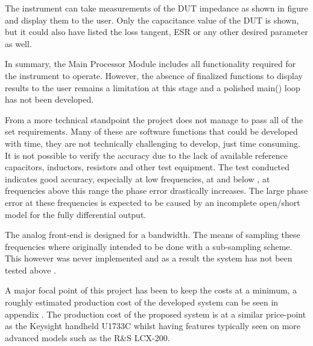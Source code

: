 The instrument can take measurements of the DUT impedance as shown in figure  and display them to the user. Only the capacitance value of the DUT is shown, but it could also have listed the loss tangent, ESR or any other desired parameter as well.

In summary, the Main Processor Module includes all functionality required for the instrument to operate. However, the absence of finalized functions to display results to the user remains a limitation at this stage and a polished main() loop has not been developed.

From a more technical standpoint the project does not manage to pass all of the set requirements. Many of these are software functions that could be developed with time, they are not technically challenging to develop, just time consuming. It is not possible to verify the accuracy due to the lack of available reference capacitors, inductors, resistors and other test equipment. The test conducted indicates good accuracy, especially at low frequencies, at and below , at frequencies above this range the phase error drastically increases. The large phase error at these frequencies is expected to be caused by an incomplete open/short model for the fully differential output. 

The analog front-end is designed for a  bandwidth. The means of sampling these frequencies where originally intended to be done with a sub-sampling scheme. This however was never implemented and as a result the system has not been tested above .

A major focal point of this project has been to keep the costs at a minimum, a roughly estimated production cost of the developed system can be seen in appendix . The production cost of the proposed system is at a similar price-point as the Keysight handheld U1733C whilst having features typically seen on more advanced models such as the R\&S LCX-200.


